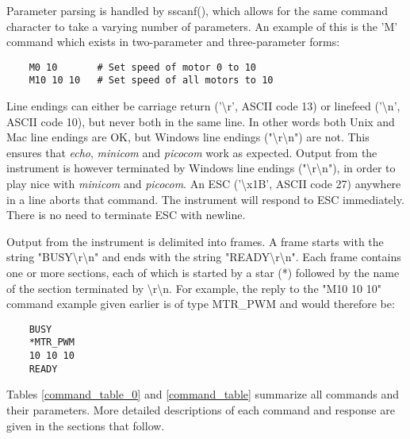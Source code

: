 \documentclass{article}
\begin{document}
Parameter parsing is handled by sscanf(), which allows for the same command character to take a varying number
of parameters. An example of this is the 'M' command which exists in two-parameter and three-parameter forms:

\begin{lstlisting}
    M0 10       # Set speed of motor 0 to 10
    M10 10 10   # Set speed of all motors to 10
\end{lstlisting}


Line endings can either be carriage return ('{\textbackslash}r', ASCII code 13) or linefeed ('{\textbackslash}n', ASCII code 10), but never both in the same line.
In other words both Unix and Mac line endings are OK, but Windows line endings ("{\textbackslash}r{\textbackslash}n") are not.
This ensures that {\it echo}, {\it minicom} and {\it picocom} work as expected.
Output from the instrument is however terminated by Windows line endings ("{\textbackslash}r{\textbackslash}n"), in order to play nice with {\it minicom} and {\it picocom}.
An ESC ('{\textbackslash}x1B', ASCII code 27) anywhere in a line aborts that command.
The instrument will respond to ESC immediately.
There is no need to terminate ESC with newline.

Output from the instrument is delimited into frames.
A frame starts with the string "BUSY{\textbackslash}r{\textbackslash}n" and ends with the string "READY{\textbackslash}r{\textbackslash}n".
Each frame contains one or more sections, each of which is started by a star (*) followed by the name of the section terminated by {\textbackslash}r{\textbackslash}n.
For example, the reply to the "M10 10 10" command example given earlier is of type MTR\_PWM and would therefore be:

\begin{lstlisting}
    BUSY
    *MTR_PWM
    10 10 10
    READY
\end{lstlisting}

Tables \ref{command_table_0} and \ref{command_table} summarize all commands and their parameters.
More detailed descriptions of each command and response are given in the sections that follow.
\end{document}
